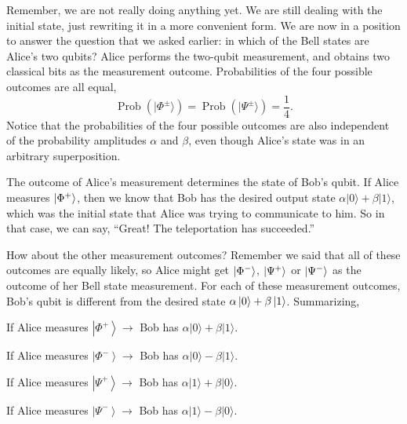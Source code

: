 Remember, we are not really doing anything yet. 
We are still dealing with the initial state, just rewriting it in a more convenient form.
We are now in a position to answer the question that we asked earlier: in which of the Bell states are Alice's two qubits?
Alice performs the two-qubit measurement, and obtains two classical bits as the measurement outcome.
Probabilities of the four possible outcomes are all equal,
\begin{equation}
    \operatorname{Prob}\left(|\Phi^{\pm}\rangle\right)=\operatorname{Prob}\left(|\Psi^{\pm}\rangle\right)=\frac{1}{4}.
\end{equation}
Notice that the probabilities of the four possible outcomes are also independent of the probability amplitudes $\alpha$ and $\beta$, even though Alice's state was in an arbitrary superposition.

The outcome of Alice's measurement determines the state of Bob's qubit.
If Alice measures $\left| \Phi^+ \right\rangle$, then we know that Bob has the desired output state $\alpha|0\rangle+\beta|1\rangle$, which was the initial state that Alice was trying to communicate to him.
So in that case, we can say, ``Great! The teleportation has succeeded.''

How about the other measurement outcomes?
Remember we said that all of these outcomes are equally likely, so Alice might get $\left| \Phi^- \right\rangle$, $\left| \Psi^+ \right\rangle$ or $\left| \Psi^- \right\rangle$ as the outcome of her Bell state measurement.
For each of these measurement outcomes, Bob's qubit is different from the desired state $\alpha\left| 0 \right\rangle+\beta\left| 1 \right\rangle$.
Summarizing,

\hspace{2cm} If Alice measures $\left|\Phi^{+}\right\rangle \rightarrow$ Bob has $\alpha|0\rangle+\beta|1\rangle$.

\hspace{2cm} If Alice measures $\left|\Phi^{-}\right\rangle \rightarrow$ Bob has $\alpha|0\rangle-\beta|1\rangle$.

\hspace{2cm} If Alice measures $\left|\Psi^{+}\right\rangle \rightarrow$ Bob has $\alpha|1\rangle+\beta|0\rangle$.

\hspace{2cm} If Alice measures $\left|\Psi^{-}\right\rangle \rightarrow$ Bob has $\alpha|1\rangle-\beta|0\rangle$.

